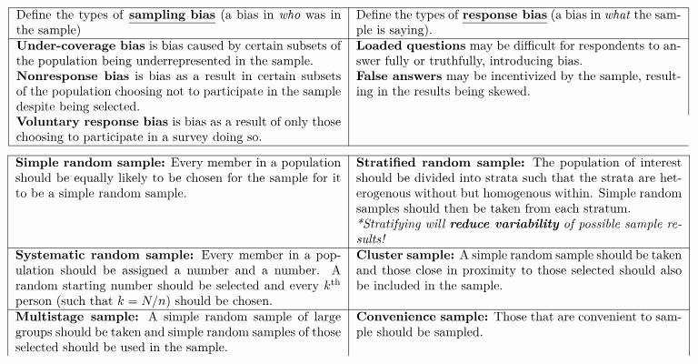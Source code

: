 \documentclass[12pt, A4]{report}
\begin{document}
			\[\begin{tabular}{|p{9cm}|p{9cm}|}\hline
				Define the types of \textbf{\underline{sampling bias}} (a bias in \emph{who} was in the sample) &
				Define the types of \textbf{\underline{response bias}} (a bias in \emph{what} the sample is saying). \\\hline
				\textbf{Under-coverage bias} is bias caused by certain subsets of the population being underrepresented in the sample. &
				\textbf{Loaded questions} may be difficult for respondents to answer fully or truthfully, introducing bias. \\
				\textbf{Nonresponse bias} is bias as a result in certain subsets of the population choosing not to participate in the sample despite being selected. &
				\textbf{False answers} may be incentivized by the sample, resulting in the results being skewed. \\
				\textbf{Voluntary response bias} is bias as a result of only those choosing to participate in a survey doing so. \\\hline
			\end{tabular}\]
			\[\begin{tabular}{|p{9cm}|p{9cm}|}\hline
				\textbf{Simple random sample:} Every member in a population should be equally likely to be chosen for the sample for it to be a simple random sample. &
				\textbf{Stratified random sample:} The population of interest should be divided into strata such that the strata are heterogenous without but homogenous within. Simple random samples should then be taken from each stratum. \\ &
					\emph{*Stratifying will \textbf{reduce variability} of possible sample results!} \\\hline
				\textbf{Systematic random sample:} Every member in a population should be assigned a number and a number. A random starting number should be selected and every $k^{\mathrm{th}}$ person (such that $k = N/n$) should be chosen. &
				\textbf{Cluster sample:} A simple random sample should be taken and those close in proximity to those selected should also be included in the sample. \\\hline
				\textbf{Multistage sample:} A simple random sample of large groups should be taken and simple random samples of those selected should be used in the sample. &
				\textbf{Convenience sample:} Those that are convenient to sample should be sampled.
			\end{tabular}\]
\end{document}
